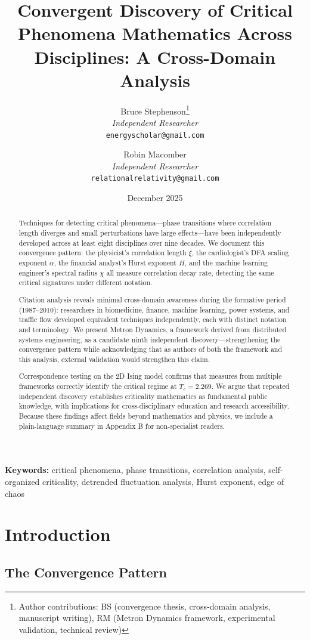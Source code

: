 \documentclass[11pt]{article}
\title{Convergent Discovery of Critical Phenomena Mathematics Across Disciplines: A Cross-Domain Analysis}
\author{
    Bruce Stephenson\thanks{Author contributions: BS (convergence thesis, cross-domain analysis, manuscript writing), RM (Metron Dynamics framework, experimental validation, technical review)} \\
    \textit{Independent Researcher} \\
    \texttt{energyscholar@gmail.com}
    \and
    Robin Macomber \\
    \textit{Independent Researcher} \\
    \texttt{relationalrelativity@gmail.com}
}
\date{December 2025}
\begin{document}
\maketitle

\begin{abstract}
Techniques for detecting critical phenomena---phase transitions where correlation length diverges and small perturbations have large effects---have been independently developed across at least eight disciplines over nine decades. We document this convergence pattern: the physicist's correlation length $\xi$, the cardiologist's DFA scaling exponent $\alpha$, the financial analyst's Hurst exponent $H$, and the machine learning engineer's spectral radius $\chi$ all measure correlation decay rate, detecting the same critical signatures under different notation.

Citation analysis reveals minimal cross-domain awareness during the formative period (1987--2010): researchers in biomedicine, finance, machine learning, power systems, and traffic flow developed equivalent techniques independently, each with distinct notation and terminology. We present Metron Dynamics, a framework derived from distributed systems engineering, as a candidate ninth independent discovery---strengthening the convergence pattern while acknowledging that as authors of both the framework and this analysis, external validation would strengthen this claim.

Correspondence testing on the 2D Ising model confirms that measures from multiple frameworks correctly identify the critical regime at $T_c = 2.269$. We argue that repeated independent discovery establishes criticality mathematics as fundamental public knowledge, with implications for cross-disciplinary education and research accessibility. Because these findings affect fields beyond mathematics and physics, we include a plain-language summary in Appendix B for non-specialist readers.
\end{abstract}

\noindent\textbf{Keywords:} critical phenomena, phase transitions, correlation analysis, self-organized criticality, detrended fluctuation analysis, Hurst exponent, edge of chaos

\section{Introduction}

\subsection{The Convergence Pattern}
\end{document}
